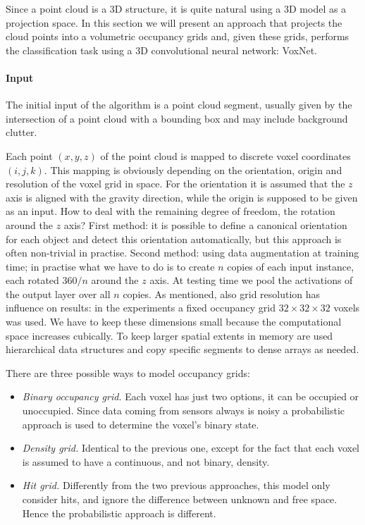 Since a point cloud is a 3D structure, it is quite natural using a 3D model as a projection space. In this section we will present an approach that projects the cloud points into a volumetric occupancy grids and, given these grids, performs the classification task using a 3D convolutional neural network: VoxNet.

\paragraph{Input}
The initial input of the algorithm is a point cloud segment, usually given by the intersection of a point cloud with a bounding box and may include background clutter. 

Each point $(x,y,z)$ of the point cloud is mapped to discrete voxel coordinates $(i,j,k)$. 
This mapping is obviously depending on the orientation, origin and resolution of the voxel grid in space. For the orientation it is assumed that the $z$ axis is aligned with the gravity direction, while the origin is supposed to be given as an input. How to deal with the remaining degree of freedom, the rotation around the $z$ axis? First method: it is possible to define a canonical orientation for each object and detect this orientation automatically, but this approach is often non-trivial in practise. Second method: using data augmentation at training time; in practise what we have to do is to create $n$ copies of each input instance, each rotated $360$\textdegree$/n$ around the $z$ axis. At testing time we pool the activations of the output layer over all $n$ copies. As mentioned, also grid resolution has influence on results: in the experiments a fixed occupancy grid $32 \times 32 \times 32$ voxels was used. We have to keep these dimensions small because the computational space increases cubically. To keep larger spatial extents in memory are used hierarchical data structures and copy specific segments to dense arrays as needed. 

There are three possible ways to model occupancy grids:
\begin{itemize}
\item \emph{Binary occupancy grid. } Each voxel has just two options, it can be occupied or unoccupied. Since data coming from sensors always is noisy a probabilistic approach is used to determine the voxel's binary state.
\item \emph{Density grid. } Identical to the previous one, except for the fact that each voxel is assumed to have a continuous, and not binary, density.
\item \emph{Hit grid. } Differently from the two previous approaches, this model only consider hits, and ignore the difference between unknown and free space. Hence the probabilistic approach is different.
\end{itemize}

